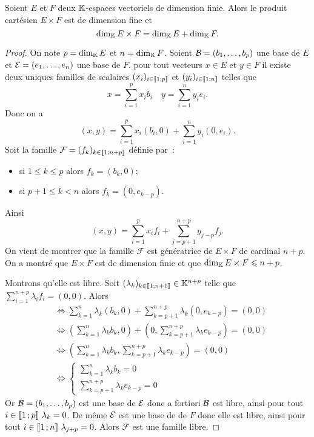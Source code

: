 \begin{theo}
  Soient \(E\) et \(F\) deux \(\mathbb{K}\)-espaces vectoriels de dimension finie. Alors 
  le produit cartésien \(E \times F\) est de dimension fine et
  \begin{equation}
    \operatorname{dim}_{\mathbb{K}} E \times F = \operatorname{dim}_{\mathbb{K}} E + \operatorname{dim}_{\mathbb{K}} F.
  \end{equation}
\end{theo}
\begin{proof}
  On note \(p=\operatorname{dim}_{\mathbb{K}} E\) et \(n=\operatorname{dim}_{\mathbb{K}} F\). Soient \(\mathcal{B}=(b_1,\ldots, b_p)\) 
  une base de \(E\) et \(\mathcal{E}=(e_1, \ldots, e_n)\) une base de \(F\). pour tout 
  vecteurs \(x \in E\) et \(y \in F\) il existe deux uniques familles de 
  scalaires \((x_i)_{i \in \mathopen{\llbracket}1\mathclose{}\mathpunct{};p\mathclose{\rrbracket}}\) et \((y_i)_{i \in 
  \mathopen{\llbracket}1\mathclose{}\mathpunct{};n\mathclose{\rrbracket}}\) telles que
  \begin{equation}
    x = \sum_{i=1}^p x_i b_i \quad y = \sum_{i=1}^n y_i e_i.
  \end{equation}
  Donc on a
  \begin{equation}
    (x,y) = \sum_{i=1}^p x_i (b_i,0) + \sum_{i=1}^n y_i (0,e_i).
  \end{equation}
  Soit la famille \(\mathcal{F}=(f_k)_{k \in \mathopen{\llbracket}1\mathclose{}\mathpunct{};n+p\mathclose{\rrbracket}}\) 
  définie par~:
  \begin{itemize}
    \item si \(1 \leqslant k \leqslant p\) alors \(f_k=(b_k,0)\);
    \item si \(p+1 \leqslant k < n\) alors \(f_k=(0,e_{k-p})\).
  \end{itemize}
  Ainsi
  \begin{equation}
    (x,y)=\sum_{i=1}^p x_i f_i + \sum_{j=p+1}^{n+p} y_{j-p} f_j.
  \end{equation}
  On vient de montrer que la famille \(\mathcal{F}\) est génératrice de \(E 
  \times F\) de cardinal \(n+p\). On a montré que \(E \times F\) est de 
  dimension finie et que \(\operatorname{dim}_{\mathbb{K}} E\times F \leqslant n+p\). 

  Montrons qu'elle est libre. Soit \((\lambda_k)_{k \in 
  \mathopen{\llbracket}1\mathclose{}\mathpunct{};n+1\mathclose{\rrbracket}} \in \mathbb{K}^{n+p}\) telle que \(\sum_{i=1}^{n+p} 
  \lambda_i f_i =(0,0)\). Alors
  \begin{align}
    &\iff \sum_{k=1}^n \lambda_k (b_k,0) + \sum_{k=p+1}^{n+p} \lambda_k 
    (0,e_{k-p}) =(0,0)\\
    &\iff \left(\sum_{k=1}^n \lambda_k b_k,0 \right) + 
    \left(0,\sum_{k=p+1}^{n+p} \lambda_k e_{k-p}\right) =(0,0)\\
    &\iff \left(\sum_{k=1}^n \lambda_k b_k,\sum_{k=p+1}^{n+p} \lambda_k 
    e_{k-p}\right) = (0,0) \\
    &\iff \begin{cases} \sum_{k=1}^n \lambda_k b_k = 0 \\ \sum_{k=p+1}^{n+p} 
    \lambda_k e_{k-p} =0 \end{cases}
  \end{align}
  Or \(\mathcal{B}=(b_1,\ldots, b_p)\) est une base de \(\mathcal{E}\) donc a fortiori \(\mathcal{B}\) est 
  libre, ainsi pour tout \(i \in \intervalleentier{1}{p} \ \lambda_k=0\). De 
  même \(\mathcal{E}\) est une base de de \(F\) donc elle est libre, ainsi pour tout \(i 
  \in \mathopen{\llbracket}1\mathclose{}\mathpunct{};n\mathclose{\rrbracket} \ \lambda_{j+p}=0\). Alors \(\mathcal{F}\) est une 
  famille libre.


\end{proof}
